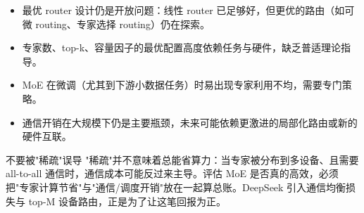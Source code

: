\documentclass[a4paper]{article}
\begin{document}
\begin{itemize}
\item 最优 router 设计仍是开放问题：线性 router 已足够好，但更优的路由（如可微 routing、专家选择 routing）仍在探索。
\item 专家数、top-k、容量因子的最优配置高度依赖任务与硬件，缺乏普适理论指导。
\item MoE 在微调（尤其到下游小数据任务）时易出现专家利用不均，需要专门策略。
\item 通信开销在大规模下仍是主要瓶颈，未来可能依赖更激进的局部化路由或新的硬件互联。
\end{itemize}

\begin{warningbox}{不要被"稀疏"误导}
"稀疏"并不意味着总能省算力：当专家被分布到多设备、且需要 all-to-all 通信时，通信成本可能反过来主导。评估 MoE 是否真的高效，必须把"专家计算节省"与"通信/调度开销"放在一起算总账。DeepSeek 引入通信均衡损失与 top-M 设备路由，正是为了让这笔回报为正。
\end{warningbox}
\end{document}
